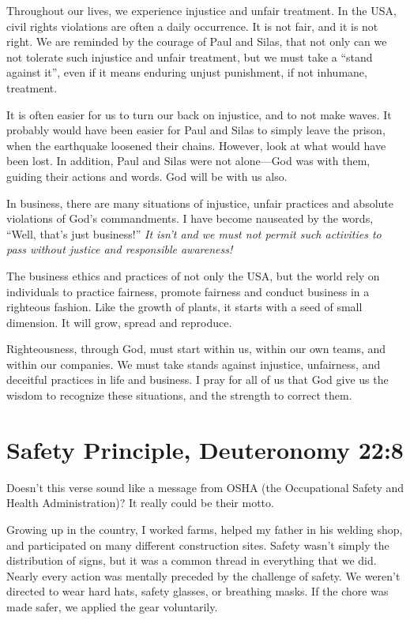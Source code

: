\documentclass[12pt]{memoir}
\begin{document}
Throughout our lives, we experience injustice and unfair treatment.
In the USA, civil rights violations are often a daily occurrence.
It is not fair, and it is not right.
We are reminded by the courage
of Paul and Silas, that not only can we not tolerate such injustice
and unfair treatment, but we must take a ``stand against it'', even
if it means enduring unjust punishment, if not inhumane, treatment.

It is often easier for us to turn our back on injustice, and to not
make waves.
It probably would have been easier for Paul and Silas
to simply leave the prison, when the earthquake loosened their chains.
However, look at what would have been lost. In addition, Paul and
Silas were not alone---God was with them, guiding their actions and
words. God will be with us also.

In business, there are many situations of injustice, unfair practices
and absolute violations of God's commandments. I have become nauseated
by the words, ``Well, that's just business!'' \emph{It isn't and
we must not permit such activities to pass without justice and responsible
awareness!}

The business ethics and practices of not only the USA, but the world
rely on individuals to practice fairness, promote fairness and conduct
business in a righteous fashion. Like the growth of plants, it starts
with a seed of small dimension. It will grow, spread and reproduce.

Righteousness, through God, must start within us, within our own teams,
and within our companies. We must take stands against injustice, unfairness,
and deceitful practices in life and business. I pray for all of us
that God give us the wisdom to recognize these situations, and the
strength to correct them.

\section[Safety Principle]{Safety Principle, Deuteronomy 22:8}

Doesn't this verse sound like a message from OSHA (the Occupational Safety and Health Administration)? It really could be their motto.

Growing up in the country, I worked farms, helped my father in his welding shop, and participated on many different construction sites. Safety wasn't simply the distribution of signs, but it was a common thread in everything that we did. Nearly every action was mentally preceded by the challenge of safety. We weren't directed to wear hard hats, safety glasses, or breathing masks. If the chore was made safer, we applied the gear voluntarily.
\end{document}
